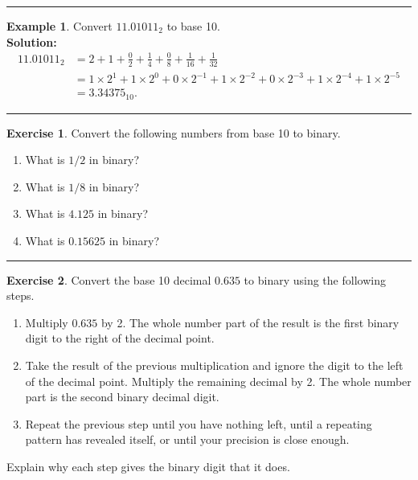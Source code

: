 \documentclass[
]{book}
\providecommand{\tightlist}{%
  \setlength{\itemsep}{0pt}\setlength{\parskip}{0pt}}
\theoremstyle{definition}
\theoremstyle{definition}
\newtheorem{example}{Example}[chapter]
\theoremstyle{definition}
\newtheorem{exercise}{Exercise}[chapter]
\theoremstyle{remark}
\begin{document}
\begin{center}\rule{0.5\linewidth}{0.5pt}\end{center}

\begin{example}
\protect\hypertarget{exm:unnamed-chunk-16}{}{\label{exm:unnamed-chunk-16} }Convert \(11.01011_2\) to base 10.\\
\textbf{Solution:} \[\begin{aligned}
        11.01011_2 &= 2 + 1 + \frac{0}{2} + \frac{1}{4} + \frac{0}{8} + \frac{1}{16} +
        \frac{1}{32} \\ &= 1 \times 2^1 + 1 \times 2^0 + 0 \times 2^{-1} + 1 \times 2^{-2} + 0
        \times 2^{-3} + 1 \times 2^{-4} + 1 \times 2^{-5}\\ &= 3.34375_{10}.
    \end{aligned}\]
\end{example}

\begin{center}\rule{0.5\linewidth}{0.5pt}\end{center}

\begin{exercise}
\protect\hypertarget{exr:unnamed-chunk-17}{}{\label{exr:unnamed-chunk-17} }Convert the following numbers from base 10 to binary.

\begin{enumerate}
\def\labelenumi{\arabic{enumi}.}
\tightlist
\item
  What is \(1/2\) in binary?
\item
  What is \(1/8\) in binary?
\item
  What is \(4.125\) in binary?
\item
  What is \(0.15625\) in binary?
\end{enumerate}
\end{exercise}

\begin{center}\rule{0.5\linewidth}{0.5pt}\end{center}

\begin{exercise}
\protect\hypertarget{exr:unnamed-chunk-18}{}{\label{exr:unnamed-chunk-18} }Convert the base 10 decimal \(0.635\) to binary using the following steps.

\begin{enumerate}
\def\labelenumi{\arabic{enumi}.}
\tightlist
\item
  Multiply \(0.635\) by 2. The whole number part of the result is the
  first binary digit to the right of the decimal point.
\item
  Take the result of the previous multiplication and ignore the digit
  to the left of the decimal point. Multiply the remaining decimal
  by 2. The whole number part is the second binary decimal digit.
\item
  Repeat the previous step until you have nothing left, until a repeating pattern has revealed itself, or until your precision is close enough.
\end{enumerate}

Explain why each step gives the binary digit that it does.
\end{exercise}
\end{document}
